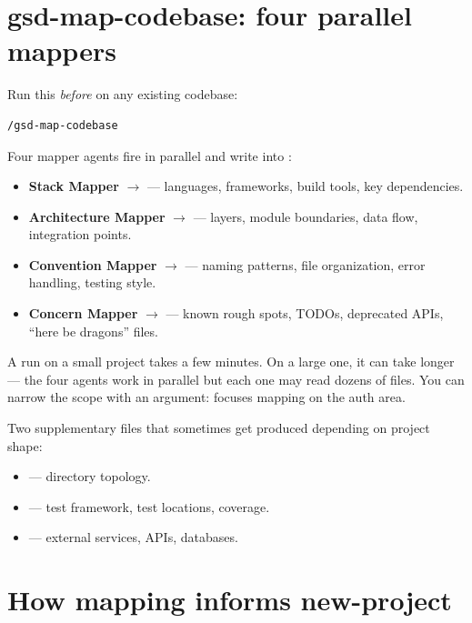 \documentclass[11pt,letterpaper,openany]{book}
\begin{document}
\section{gsd-map-codebase: four parallel mappers}

Run this \emph{before}  on any existing codebase:

\begin{lstlisting}
/gsd-map-codebase
\end{lstlisting}

Four mapper agents fire in parallel and write into :

\begin{itemize}[itemsep=2pt]
  \item \textbf{Stack Mapper} $\rightarrow$  --- languages, frameworks, build tools, key dependencies.
  \item \textbf{Architecture Mapper} $\rightarrow$  --- layers, module boundaries, data flow, integration points.
  \item \textbf{Convention Mapper} $\rightarrow$  --- naming patterns, file organization, error handling, testing style.
  \item \textbf{Concern Mapper} $\rightarrow$  --- known rough spots, TODOs, deprecated APIs, ``here be dragons'' files.
\end{itemize}

A  run on a small project takes a few minutes. On a large one, it can take longer --- the four agents work in parallel but each one may read dozens of files. You can narrow the scope with an argument:  focuses mapping on the auth area.

Two supplementary files that sometimes get produced depending on project shape:

\begin{itemize}[itemsep=2pt]
  \item {} --- directory topology.
  \item {} --- test framework, test locations, coverage.
  \item {} --- external services, APIs, databases.
\end{itemize}

\section{How mapping informs new-project}
\end{document}
